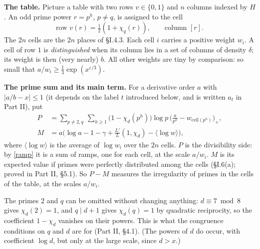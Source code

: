 \documentclass[11pt,letterpaper]{article}
\begin{document}
\textbf{The table.} Picture a table with two rows $v\in\{0,1\}$ and $n$ columns indexed by $H$. An odd
prime power $r=p^h$, $p\ne q$, is assigned to the cell
\begin{equation}\label{D:24}
 \text{row } v(r)=\tfrac12(1+\chi_q(r)),\qquad\text{column } [r] .
\end{equation}
The $2n$ cells are the $2n$ places of \S I.4.3. Each cell $i$ carries a positive weight $w_i$. A cell of row $1$ is \emph{distinguished} when its column lies in a set of columns of density $\delta$; its weight
is then (very nearly) $b$. All other weights are tiny by comparison: so small that $a/w_i\ge\frac13\exp(x^{\varepsilon/3})$.

\textbf{The prime sum and its main term.} For a derivative order $a$ with $|a/b-x|\le1$ (it depends on the label $t$ introduced below, and is written
$a_t$ in Part II), put
\begin{align}\label{D:25}
 P&=\sum_{p\ne2,q}\ \sum_{h\ge1}\big(1-\chi_d(p^h)\big)\log p\,
     \Big(\frac a{p^h}-w_{\mathrm{cell}(p^h)}\Big)_+ ,\\
 M&=a\Big(\log a-1-\gamma+\frac{L'}{L}(1,\chi_d)-\langle\log w\rangle\Big),
\end{align}
where $\langle\log w\rangle$ is the average of $\log w_i$ over the $2n$ cells. $P$ is the divisibility side:
by \eqref{ramp} it is a sum of ramps, one for each cell, at the scale $a/w_i$. $M$ is its expected value
if primes were perfectly distributed among the cells (\S I.6(a); proved in Part II, \S5.1). So $P-M$ measures the
irregularity of primes in the cells of the table, at the scales $a/w_i$.

The primes $2$ and $q$ can be omitted without changing anything: $d\equiv7\bmod8$ gives $\chi_d(2)=1$, and
$q\mid d+1$ gives $\chi_d(q)=1$ by quadratic reciprocity, so the coefficient $1-\chi_d$ vanishes on their
powers. This is what the congruence conditions on $q$ and $d$ are for (Part II, \S4.1). (The powers of $d$
do occur, with coefficient $\log d$, but only at the large scale, since $d>x$.)
\end{document}
